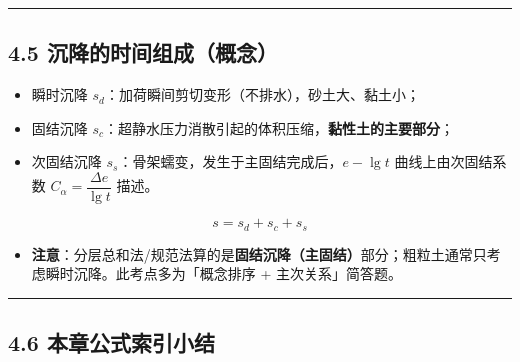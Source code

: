 \documentclass[
]{article}
\providecommand{\tightlist}{%
  \setlength{\itemsep}{0pt}\setlength{\parskip}{0pt}}
\begin{document}
\begin{center}\rule{0.5\linewidth}{0.5pt}\end{center}

\subsection{4.5
沉降的时间组成（概念）}\label{ux6c89ux964dux7684ux65f6ux95f4ux7ec4ux6210ux6982ux5ff5}

\begin{itemize}
\tightlist
\item
  瞬时沉降 \(s_d\)：加荷瞬间剪切变形（不排水），砂土大、黏土小；
\item
  固结沉降
  \(s_c\)：超静水压力消散引起的体积压缩，\textbf{黏性土的主要部分}；
\item
  次固结沉降 \(s_s\)：骨架蠕变，发生于主固结完成后，\(e-\lg t\)
  曲线上由次固结系数 \(C_\alpha=\dfrac{\Delta e}{\lg t}\) 描述。
\end{itemize}

\[s=s_d+s_c+s_s\]

\begin{itemize}
\tightlist
\item
  \textbf{注意}：分层总和法/规范法算的是\textbf{固结沉降（主固结）}部分；粗粒土通常只考虑瞬时沉降。此考点多为「概念排序
  + 主次关系」简答题。
\end{itemize}

\begin{center}\rule{0.5\linewidth}{0.5pt}\end{center}

\subsection{4.6
本章公式索引小结}\label{ux672cux7ae0ux516cux5f0fux7d22ux5f15ux5c0fux7ed3-3}
\end{document}

